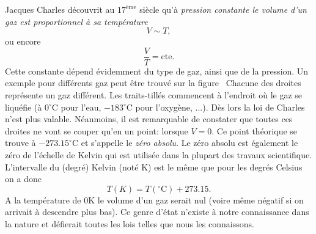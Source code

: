 \documentclass[a4paper,12pt]{book}
\newcommand{\K}{\mathrm{K}}
\newcommand{\C}{\mathrm{C}}
\begin{document}
Jacques Charles découvrit au $17^\textrm{\`eme}$ siècle 
qu'à \textit{pression constante le volume d'un gaz est proportionnel à sa température} 
\begin{equation}
V\sim T,
\end{equation}
ou encore 
\begin{equation}
\frac{V}{T}=\mbox{cte}.
\end{equation}
Cette constante dépend évidemment du type de gaz, ainsi que
de la pression. Un exemple pour différents gaz peut être trouvé sur la figure~%
Chacune des droites représente un gaz différent. Les traits-tillés commencent à l'endroit où le gaz se liquéfie 
(à $0^\circ\C$ pour l'eau, $-183^\circ\C$ pour l'oxygène, ...). 
Dès lors la loi de Charles n'est plus valable. Néanmoins,
il est remarquable de constater que toutes ces droites ne vont se couper qu'en un point: lorsque $V=0$. Ce point théorique se trouve à $-273.15^\circ\C$ et s'appelle le
\textit{zéro absolu}. Le zéro absolu est également le zéro
de l'échelle de Kelvin qui est utilisée dans la plupart des travaux scientifique. L'intervalle du (degré) Kelvin (noté $\K$) est le même que pour les degrés Celsius on a donc
\begin{equation}
T(K)=T(^\circ\C)+273.15.
\end{equation}
A la température de $0\K$ le volume d'un gaz serait nul 
(voire même négatif si on arrivait à descendre plus bas).
Ce genre d'état n'existe à notre connaissance dans la nature et 
défierait toutes les lois telles que nous les connaissons.
\end{document}
